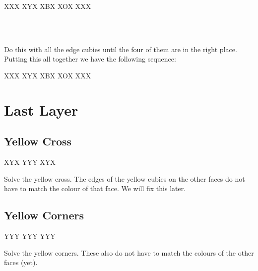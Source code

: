 \documentclass{article}
\begin{document}
    
    \RubikFaceUp XXX XYX XBX
    \RubikSliceTopR XOX XXX

    \\
    \\
    \textcube{}

    Do this with all the edge cubies until the four of them are in the right place.
    Putting this all together we have the following sequence:

    
    \RubikFaceUp XXX XYX XBX
    \RubikSliceTopR XOX XXX
    \textcube{}
    \textcube{}

    \section{Last Layer}

    \subsection{Yellow Cross}

    \RubikCubeGreyAll
    \RubikFaceUp XYX YYY XYX

    \begin{goal}[\DrawRubikFaceUp]
        Solve the yellow cross.
        The edges of the yellow cubies on the other faces do not have to match the colour of that face.
        We will fix this later.
    \end{goal}

    \subsection{Yellow Corners}
    \RubikCubeGreyAll
    \RubikFaceUp YYY YYY YYY

    \begin{goal}[\DrawRubikFaceUp]
        Solve the yellow corners.
        These also do not have to match the colours of the other faces (yet).
    \end{goal}
\end{document}
